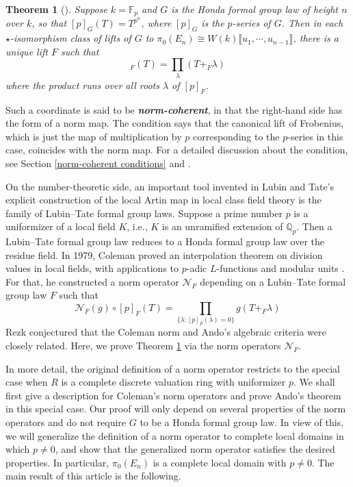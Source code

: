 \documentclass[12pt]{article}
\newtheorem{theorem}{Theorem}[section]
\theoremstyle{definition}
\newcommand{\PS}[1]{\llbracket #1 \rrbracket}
\def\Q{\mathbb{Q}}
\def\F{\mathbb{F}}
\def\CN{\mathscr{N}}
\begin{document}
    \begin{theorem}[{{\cite[Theorem 4]{And95}}}] \label{Ando Theorem 4}
        Suppose $k = \F_p$ and $G$ is the Honda formal group law of height $n$ over $k$, so that $[p]_G(T) = T^{p^n}$, where $[p]_G$ is the $p$-series of $G$. Then in each $\star$-isomorphism class of lifts of $G$ to $\pi_0(E_n) \cong W(k)\PS{u_1,\cdots,u_{n-1}}$, there is a unique lift $F$ such that 
        \begin{equation*}
            [p]_F(T) = \prod_{\lambda} (T +_F \lambda)
        \end{equation*}
        where the product runs over all roots $\lambda$ of $[p]_F$. 
    \end{theorem}
    Such a coordinate is said to be \textbf{\em{norm-coherent}}, in that the right-hand side has the form of a norm map. The condition says that the canonical lift of Frobenius, which is just the map of multiplication by $p$ corresponding to the $p$-series in this case, coincides with the norm map. For a detailed discussion about the condition, see Section \ref{norm-coherent conditions} and \cite[Section 6]{Zhu20}. \par 
    On the number-theoretic side, an important tool invented in Lubin and Tate's explicit construction of the local Artin map in local class field theory is the family of Lubin--Tate formal group laws. Suppose a prime number $p$ is a uniformizer of a local field $K$, i.e., $K$ is an unramified extension of $\Q_p$. Then a Lubin--Tate formal group law reduces to a Honda formal group law over the residue field. In 1979, Coleman proved an interpolation theorem on division values in local fields, with applications to $p$-adic $L$-functions and modular units \cite[Theorem A]{Col79}. For that, he constructed a norm operator $\CN_F$ depending on a Lubin--Tate formal group law $F$ such that  
    \begin{equation*}
        \CN_F(g) \circ [p]_F(T) = \prod_{\{\lambda \colon [p]_F(\lambda) = 0\}} g(T +_F \lambda)
    \end{equation*}
    Rezk conjectured that the Coleman norm and Ando's algebraic criteria were closely related. Here, we prove Theorem \ref{Ando Theorem 4} via the norm operators $\CN_F$. \par 
    In more detail, the original definition of a norm operator restricts to the special case when $R$ is a complete discrete valuation ring with uniformizer $p$. We shall first give a description for Coleman's norm operators and prove Ando's theorem in this special case. Our proof will only depend on several properties of the norm operators and do not require $G$ to be a Honda formal group law. In view of this, we will generalize the definition of a norm operator to complete local domains in which $p \neq 0$, and show that the generalized norm operator satisfies the desired properties. In particular, $\pi_0(E_n)$ is a complete local domain with $p \neq 0$. The main result of this article is the following. 
\end{document}
